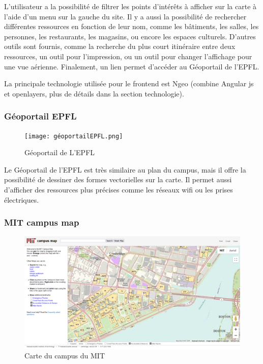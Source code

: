 \documentclass[
    iai, %
    il, %
]{heig-tb}
\begin{document}
L'utilisateur a la possibilité de filtrer les points d'intérêts à afficher sur la carte à l'aide d'un menu sur la gauche du site.
Il y a aussi la possibilité de rechercher différentes ressources en fonction de leur nom, comme les bâtiments, les salles, les personnes, les restaurants, les magasins, ou encore les espaces culturels.
D'autres outils sont fournis, comme la recherche du plus court itinéraire entre deux ressources, un outil pour l'impression, ou un outil pour changer l'affichage pour une vue aérienne.
Finalement, un lien permet d'accéder au Géoportail de l'EPFL.

La principale technologie utilisée pour le frontend est Ngeo (combine Angular js et openlayers, plus de détails dans la section technologie).

\subsubsection{Géoportail EPFL}

\begin{figure}[h]
    \centering
    \texttt{[image: géoportailEPFL.png]}
    \caption{Géoportail de L'EPFL}
\end{figure}

Le Géoportail de l'EPFL \cite{geoportail-epfl} est très similaire au plan du campus, mais il offre la possibilité de dessiner des formes vectorielles sur la carte.
Il permet aussi d'afficher des ressources plus précises comme les réseaux wifi ou les prises électriques.

\subsubsection{MIT campus map}

\begin{figure}[h]
    \centering
    \includegraphics[scale=0.7]{MitCampusMap.png}
    \caption{Carte du campus du MIT}
\end{figure}
\end{document}
